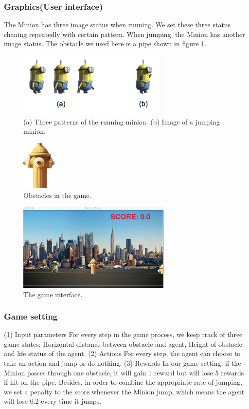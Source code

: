 \documentclass{acmsiggraph}
\begin{document}
\subsubsection{Graphics(User interface)}
The Minion has three image status when running. We set these three status chaning repeatedly with certain pattern. When jumping, the Minion has another image status. The obstacle we used here is a pipe shown in figure \ref{fig:minion}.


\begin{figure}[ht]
  \centering
  \includegraphics[width=3.0in]{../fig/minion.png}
  \caption{(a) Three patterns of the running minion. (b) Image of a jumping minion.}
  \label{fig:minion}
\end{figure}


\begin{figure}[ht]
  \centering
  \includegraphics[width=50pt]{../fig/obstacle.png}
  \caption{Obstacles in the game.}
  \label{fig:obstacle}
\end{figure}


\begin{figure}[ht]
  \centering
  \includegraphics[width=3.0in]{../fig/interface.jpg}
  \caption{The game interface.}
  \label{fig:interface}
\end{figure}

\subsubsection{Game setting}
(1) Input parameters
For every step in the game process, we keep track of three game states: Horizontal distance between obstacle and agent, Height of obstacle and life status of the agent.
(2) Actions
For every step, the agent can choose to take an action and jump or do nothing.
(3) Rewards
In our game setting, if the Minion passes through one obstacle, it will gain 1 reward but will lose 5 rewards if hit on the pipe. Besides, in order to combine the appropriate rate of jumping, we set a penalty to the score whenever the Minion jump, which means the agent will lose 0.2 every time it jumps. 
\end{document}

